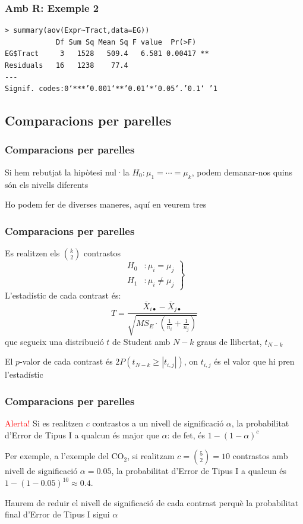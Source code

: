 \documentclass[12pt,t]{beamer}
\newcommand{\red}[1]{\textcolor{red}{#1}}
\renewcommand{\geq}{\geqslant}
\theoremstyle{plain}
\theoremstyle{definition}
\begin{document}
\begin{frame}[fragile]
\frametitle{Amb R: Exemple 2}

{\small \begin{verbatim}
> summary(aov(Expr~Tract,data=EG))
            Df Sum Sq Mean Sq F value  Pr(>F)   
EG$Tract     3   1528   509.4   6.581 0.00417 **
Residuals   16   1238    77.4                   
---
Signif. codes:0‘***’0.001‘**’0.01‘*’0.05‘.’0.1‘ ’1
 \end{verbatim}
}
\end{frame}


\subsection{Comparacions per parelles}
\begin{frame}
\frametitle{Comparacions per parelles}

Si hem rebutjat la hipòtesi nul·la $H_0:\mu_1=\cdots =\mu_k$, podem demanar-nos
quins són els nivells diferents
\medskip

Ho podem fer de diverses maneres, aquí en veurem tres
\end{frame}

\begin{frame}
\frametitle{Comparacions per parelles}
Es realitzen els $\displaystyle\binom{k}{2}$
contrastos
$$
\left.
\begin{array}{ll}
H_0 &: \mu_i=\mu_j \\
H_1 &: \mu_i\not=\mu_j
\end{array}
\right\}
$$
L'estadístic de cada contrast 
és:
$$
T=\frac{\overline{X}_{i\bullet} - \overline{X}_{j\bullet}}{\sqrt{MS_E\cdot (\frac{1}{n_i}
+\frac{1}{n_j})}}
$$
que segueix una distribució $t$ de Student amb $N-k$ graus de
llibertat, $t_{N-k}$
\medskip

El $p$-valor de cada contrast és $2P(t_{N-k}\geq |t_{i,j}|)$, on $t_{i,j}$ és el valor que hi pren l'estadístic
\end{frame}



\begin{frame}
\frametitle{Comparacions per parelles}
\red{Alerta!}
Si es realitzen $c$ contrastos a un nivell de significació $\alpha$, la probabilitat d'Error de Tipus I a qualcun és major que $\alpha$: de fet, és $ 1-(1-\alpha)^c$
\bigskip

Per exemple, a l'exemple del CO${}_2$, si realitzam $c=\binom{5}{2}=10$ contrastos amb nivell de significació $\alpha =0.05$, la probabilitat d'Error de Tipus I a qualcun és 
$ 1-(1-0.05)^{10} \approx 0.4$.
\bigskip

Haurem de reduir el nivell de significació de cada contrast perquè la probabilitat final d'Error de Tipus I sigui $\alpha$
\end{frame}
\end{document}
